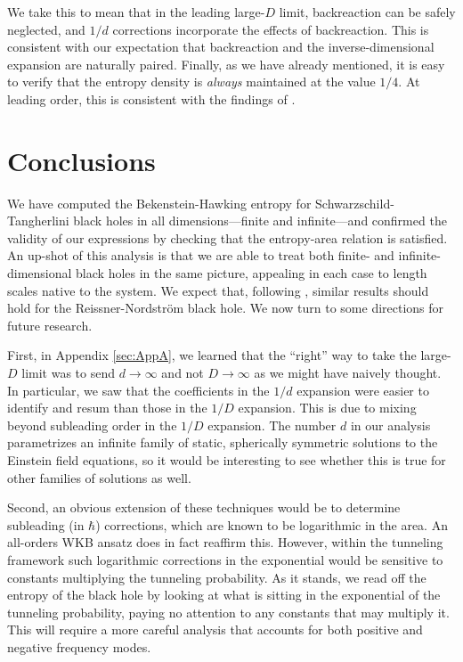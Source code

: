 \documentclass[a4paper,11pt]{article}
\begin{document}
We take this to mean that in the leading large-$D$ limit, backreaction can be safely neglected, and $1/d$ corrections incorporate the effects of backreaction. This is consistent with our expectation that backreaction and the inverse-dimensional expansion are naturally paired. Finally, as we have already mentioned, it is easy to verify that the entropy density is \emph{always} maintained at the value $1/4$. At leading order, this is consistent with the findings of \cite{Bhattacharyya:2016nhn}.

\section{Conclusions}
\label{sec:Conclusions}
We have computed the Bekenstein-Hawking entropy for Schwarzschild-Tangherlini black holes in all dimensions---finite and infinite---and confirmed the validity of our expressions by checking that the entropy-area relation is satisfied. An up-shot of this analysis is that we are able to treat both finite- and infinite-dimensional black holes in the same picture, appealing in each case to length scales native to the system. We expect that, following \cite{Parikh:1999mf}, similar results should hold for the Reissner-Nordstr\"om black hole. We now turn to some directions for future research.

First, in Appendix \ref{sec:AppA}, we learned that the ``right'' way to take the large-$D$ limit was to send $d \rightarrow \infty$ and not $D \rightarrow \infty$ as we might have naively thought. In particular, we saw that the coefficients in the $1/d$ expansion were easier to identify and resum than those in the $1/D$ expansion. This is due to mixing beyond subleading order in the $1/D$ expansion. The number $d$ in our analysis parametrizes an infinite family of static, spherically symmetric solutions to the Einstein field equations, so it would be interesting to see whether this is true for other families of solutions as well. 

Second, an obvious extension of these techniques would be to determine subleading (in $\hbar$) corrections, which are known to be logarithmic in the area. An all-orders WKB ansatz does in fact reaffirm this. However, within the tunneling framework such logarithmic corrections in the exponential would be sensitive to constants multiplying the tunneling probability. As it stands, we read off the entropy of the black hole by looking at what is sitting in the exponential of the tunneling probability, paying no attention to any constants that may multiply it. This will require a more careful analysis that accounts for both positive and negative frequency modes.
\end{document}
